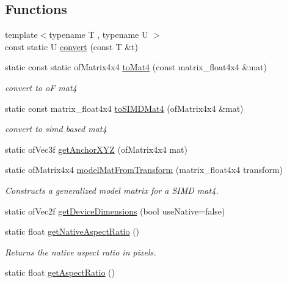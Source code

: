 \subsection*{Functions}
\begin{DoxyCompactItemize}
\item 
{\footnotesize template$<$typename T , typename U $>$ }\\const static U \hyperlink{namespace_a_r_common_ab67b42b84c068f0c4ab2401ea3af86c6}{convert} (const T \&t)
\item 
static const static of\+Matrix4x4 \hyperlink{namespace_a_r_common_a7ea27fb9de7e7890d46de5bea9b535e6}{to\+Mat4} (const matrix\+\_\+float4x4 \&mat)
\begin{DoxyCompactList}\small\item\em convert to oF mat4 \end{DoxyCompactList}\item 
static const matrix\+\_\+float4x4 \hyperlink{namespace_a_r_common_a94f59f549eb5aec3f077b54ae5e5df86}{to\+S\+I\+M\+D\+Mat4} (of\+Matrix4x4 \&mat)
\begin{DoxyCompactList}\small\item\em convert to simd based mat4 \end{DoxyCompactList}\item 
static of\+Vec3f \hyperlink{namespace_a_r_common_a5a232f6315a3a5b74678034efadd5d20}{get\+Anchor\+X\+YZ} (of\+Matrix4x4 mat)
\item 
static of\+Matrix4x4 \hyperlink{namespace_a_r_common_aec58705c71590506c5f1f86e927f11e1}{model\+Mat\+From\+Transform} (matrix\+\_\+float4x4 transform)
\begin{DoxyCompactList}\small\item\em Constructs a generalized model matrix for a S\+I\+MD mat4. \end{DoxyCompactList}\item 
static of\+Vec2f \hyperlink{namespace_a_r_common_a37407572659749170d1906046fa1921c}{get\+Device\+Dimensions} (bool use\+Native=false)
\item 
static float \hyperlink{namespace_a_r_common_a00f3449531f154cba4a751128117052f}{get\+Native\+Aspect\+Ratio} ()
\begin{DoxyCompactList}\small\item\em Returns the native aspect ratio in pixels. \end{DoxyCompactList}\item 
static float \hyperlink{namespace_a_r_common_a5c33a5f3620614da8b3be53f6811d7ca}{get\+Aspect\+Ratio} ()

\end{DoxyCompactItemize}
